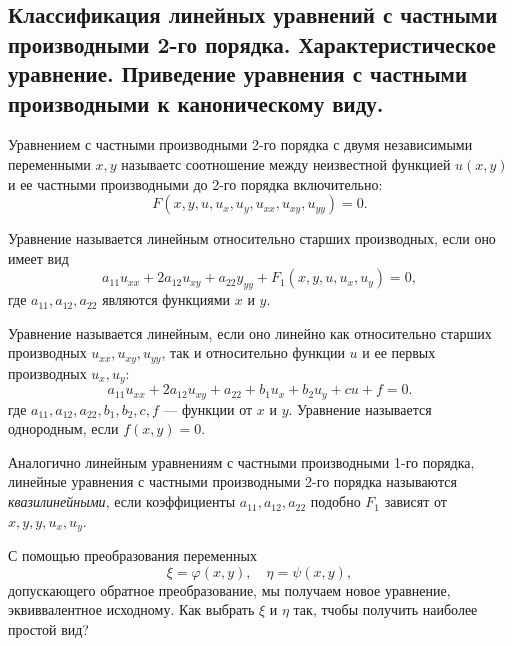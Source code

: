 \subsection{Классификация линейных уравнений с частными производными 2-го порядка. Характеристическое уравнение. Приведение уравнения с частными производными к каноническому виду.}
\label{sec:types}

Уравнением с частными производными 2-го порядка с двумя независимыми переменными $x, y$ называетс соотношение между неизвестной функцией $ u(x, y)$ и ее частными производными до 2-го порядка включительно:
\begin{equation}
	F(x, y, u, u_x, u_y, u_{xx}, u_{xy}, u_{yy}) = 0.
\end{equation}

Уравнение называется линейным относительно старших производных, если оно имеет вид
\begin{equation} \label{SOlineq}
	a_{11} u_{xx} + 2 a_{12} u_{xy} + a_{22} y_{yy} + F_1(x, y, u, u_x, u_y) = 0,
\end{equation}
где $a_{11}, a_{12}, a_{22}$ являются функциями $x$ и $y$.

Уравнение называется линейным, если оно линейно как относительно старших производных $u_{xx}, u_{xy}, u_{yy}$, так и относительно функции $u$ и ее первых производных $u_x, u_y$:
\begin{equation} \label{SOeq}
	a_{11}  u_{xx} + 2 a_{12} u_{xy} + a_{22} + b_1 u_x + b_2 u_y + c u + f = 0. 
\end{equation}
где $a_{11}, a_{12}, a_{22}, b_1, b_2, c, f$ --- функции от $x$ и $y$. Уравнение называется однородным, если $f(x, y) = 0$.

Аналогично линейным уравнениям с частными производными 1-го порядка, линейные уравнения с частными производными 2-го порядка называются \textit{квазилинейными}, если коэффициенты $a_{11}, a_{12}, a_{22}$ подобно $F_1$ зависят от $x, y, y, u_x, u_y$. 

С помощью преобразования переменных
\begin{equation*}
	\xi = \varphi(x, y), \quad \eta = \psi(x, y),
\end{equation*}
допускающего обратное преобразование, мы получаем новое уравнение, эквиввалентное исходному. Как выбрать $\xi$ и $\eta$ так, тчобы получить наиболее простой вид?

